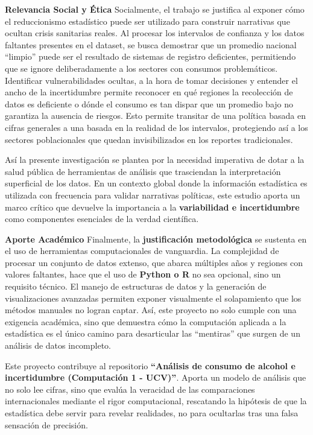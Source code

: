 \documentclass[oneside,11pt]{Latex/Classes/PhDthesisPSnPDF}
\begin{document}
\textbf{Relevancia Social y Ética} Socialmente, el trabajo se justifica
al exponer cómo el reduccionismo estadístico puede ser utilizado para
construir narrativas que ocultan crisis sanitarias reales. Al procesar
los intervalos de confianza y los datos faltantes presentes en el
dataset, se busca demostrar que un promedio nacional ``limpio'' puede
ser el resultado de sistemas de registro deficientes, permitiendo que se
ignore deliberadamente a los sectores con consumos problemáticos.
Identificar vulnerabilidades ocultas, a la hora de tomar decisiones y
entender el ancho de la incertidumbre permite reconocer en qué regiones
la recolección de datos es deficiente o dónde el consumo es tan dispar
que un promedio bajo no garantiza la ausencia de riesgos. Esto permite
transitar de una política basada en cifras generales a una basada en la
realidad de los intervalos, protegiendo así a los sectores poblacionales
que quedan invisibilizados en los reportes tradicionales.

Así la presente investigación se plantea por la necesidad imperativa de
dotar a la salud pública de herramientas de análisis que trasciendan la
interpretación superficial de los datos. En un contexto global donde la
información estadística es utilizada con frecuencia para validar
narrativas políticas, este estudio aporta un marco crítico que devuelve
la importancia a la \textbf{variabilidad e incertidumbre} como
componentes esenciales de la verdad científica.

\textbf{Aporte Académico} Finalmente, la \textbf{justificación
metodológica} se sustenta en el uso de herramientas computacionales de
vanguardia. La complejidad de procesar un conjunto de datos extenso, que
abarca múltiples años y regiones con valores faltantes, hace que el uso
de \textbf{Python o R} no sea opcional, sino un requisito técnico. El
manejo de estructuras de datos y la generación de visualizaciones
avanzadas permiten exponer visualmente el solapamiento que los métodos
manuales no logran captar. Así, este proyecto no solo cumple con una
exigencia académica, sino que demuestra cómo la computación aplicada a
la estadística es el único camino para desarticular las ``mentiras'' que
surgen de un análisis de datos incompleto.

Este proyecto contribuye al repositorio \textbf{``Análisis de consumo de
alcohol e incertidumbre (Computación 1 - UCV)''}. Aporta un modelo de
análisis que no solo lee cifras, sino que evalúa la veracidad de las
comparaciones internacionales mediante el rigor computacional,
rescatando la hipótesis de que la estadística debe servir para revelar
realidades, no para ocultarlas tras una falsa sensación de precisión.\\
\end{document}
